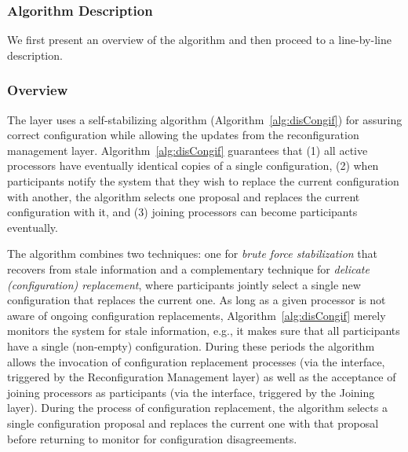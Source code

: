 \documentclass[11pt]{article}
\begin{document}
\subsubsection{Algorithm Description}
\label{sec:recSAdescr}




We first present an overview of the algorithm and then proceed to a line-by-line description. 

\subsubsection*{Overview}
The  layer uses a self-stabilizing algorithm (Algorithm~\ref{alg:disCongif})  for assuring correct configuration while allowing the updates from the reconfiguration management layer.
Algorithm~\ref{alg:disCongif} guarantees that (1) all active processors have eventually identical copies of a single configuration, (2) when participants notify the system that they wish to replace the current configuration with another, the algorithm selects one proposal and replaces the current configuration with it, and (3) joining processors can become participants eventually. 

The algorithm combines two techniques: one for \emph{brute force stabilization} that recovers from stale information and a complementary technique for \emph{delicate (configuration) replacement}, where participants jointly select a single new configuration that replaces the current one. 
As long as a given processor is not aware of ongoing configuration replacements, Algorithm~\ref{alg:disCongif} merely monitors the system for stale information, e.g., it makes sure that all participants have a single (non-empty) configuration. During these periods the algorithm allows the invocation of configuration replacement processes (via the  interface, triggered by the Reconfiguration Management layer) as well as the acceptance of joining processors as participants (via the  interface, triggered by the Joining layer). During the process of configuration replacement, the algorithm selects a single configuration proposal and replaces the current one with that proposal before returning to monitor for configuration disagreements.
\end{document}
